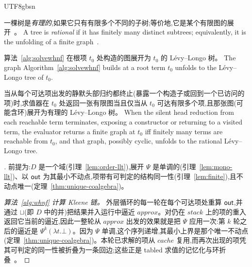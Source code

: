 \begin{CJK*}{UTF8}{gbsn}
  \begin{definition}\label{def:rational}
    \ifTablambdaChinese
    一棵树是\emph{有理的},如果它只有有限多个不同的子树;等价地,它是某个有限图的展开~\cite{courcelle1983-infinite-trees}。
    \else
    A tree is \emph{rational} if it has finitely many distinct subtrees; equivalently, it is the unfolding of a finite graph~\cite{courcelle1983-infinite-trees}.
    \fi
  \end{definition}

  \begin{theorem}\label{thm:correctness}
    \ifTablambdaChinese
    算法~\ref{alg:solvewhnf} 在根项 $t_0$ 处构造的图展开为 $t_0$ 的 Lévy--Longo 树。
    \else
    The graph Algorithm~\ref{alg:solvewhnf} builds at a root term $t_0$ unfolds to the L\'evy--Longo tree of $t_0$.
    \fi
  \end{theorem}

  \begin{theorem}\label{thm:termination}
    \ifTablambdaChinese
    当从每个可达项出发的静默头部归约都终止(暴露一个构造子或回到一个已访问的项)时,求值器在 $t_0$ 处返回一张有限图当且仅当从 $t_0$ 可达有限多个项,且那张图(可能含环)展开为有理的 Lévy--Longo 树。
    \else
    When the silent head reduction from each reachable term terminates, exposing a constructor or returning to a visited term, the evaluator returns a finite graph at $t_0$ iff finitely many terms are reachable from $t_0$, and that graph, possibly cyclic, unfolds to the rational L\'evy--Longo tree.
    \fi
  \end{theorem}

  \begin{proof}[]
    \ifTablambdaChinese
    前提为:$D$ 是一个域(引理~\ref{lem:order-llt}),展开 $\Psi$ 是单调的(引理~\ref{lem:mono-llt})、以 $\mathsf{out}$ 为其最小不动点,项带有可判定的结构同一性(引理~\ref{lem:finite}),且不动点唯一(定理~\ref{thm:unique-coalgebra})。

    \emph{算法~\ref{alg:whnf} 计算 Kleene 链。} 外层循环的每一轮在每个可达项处重算 $\mathsf{out}$,并通过 $\sqcup$(即 $D$ 中的并)把结果并入运行中逼近 $\mathit{approx}$。对仍在 $\mathit{stack}$ 上的项的重入返回它当前的逼近,因此一整轮从 $\mathit{approx}$ 出发的效果就是把 $\Psi$ 应用一次:第 $k$ 轮之后的逼近是 $\Psi^k(\lambda t.\bot)$。因为 $\Psi$ 单调,这个序列递增,其最小上界是那个唯一不动点(定理~\ref{thm:unique-coalgebra})。本轮已求解的项从 $\mathit{cache}$ 复用,而再次出现的项凭其可判定的同一性被折叠为一条回边;这些正是 tabled 求值的记忆化与环折叠~\cite{vanemden1976-predicate-logic-semantics, tamaki1986-tabled-resolution, chen1996-tabled-evaluation-delaying}。


\end{proof}
\end{CJK*}
